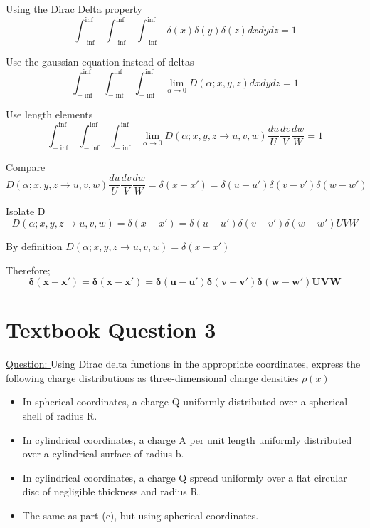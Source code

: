 \documentclass[English]{article}
\begin{document}
    Using the Dirac Delta property
    \begin{equation} \label{eq: 2-1}
        \int_{-\inf}^{\inf} \int_{-\inf}^{\inf} \int_{-\inf}^{\inf} \delta(x) \delta(y) \delta(z) dx dy dz = 1
    \end{equation}

    Use the gaussian equation instead of deltas
    \begin{equation} \label{eq: 2-2}
        \int_{-\inf}^{\inf} \int_{-\inf}^{\inf} \int_{-\inf}^{\inf} \lim_{\alpha \rightarrow 0} D(\alpha; x, y, z) dx dy dz = 1
    \end{equation}

    Use length elements
    \begin{equation} \label{eq: 2-3}
        \int_{-\inf}^{\inf} \int_{-\inf}^{\inf} \int_{-\inf}^{\inf} \lim_{\alpha \rightarrow 0} D(\alpha; x, y, z \rightarrow u, v, w) \frac{du}{U} \frac{dv}{V} \frac{dw}{W} = 1
    \end{equation}

    Compare
    \begin{equation} \label{eq: 2-4}
        D(\alpha; x, y, z \rightarrow u, v, w) \frac{du}{U} \frac{dv}{V} \frac{dw}{W} = \delta(x-x') = \delta(u-u') \delta(v-v') \delta(w-w')
    \end{equation}

    Isolate D
    \begin{equation} \label{eq: 2-5}
        D(\alpha; x, y, z \rightarrow u, v, w) = \delta(x-x') = \delta(u-u') \delta(v-v') \delta(w-w') UVW
    \end{equation}

    By definition
    $D(\alpha; x, y, z \rightarrow u, v, w) = \delta(x-x')$

    Therefore;
    \begin{equation} \label{eq: 2-6}
        \boxed{\boldsymbol{\delta(x-x') = \delta(x-x') = \delta(u-u') \delta(v-v') \delta(w-w') UVW}}
    \end{equation}

\newpage
\section{Textbook Question 3} \label{section3}
    \underline{Question: }
    \newline Using Dirac delta functions in the appropriate coordinates, express the following charge distributions as three-dimensional charge densities $\rho(x)$
    \begin{itemize}
        \item In spherical coordinates, a charge Q uniformly distributed over a spherical shell of radius R.
        \item In cylindrical coordinates, a charge A per unit length uniformly distributed over a cylindrical surface of radius b.
        \item In cylindrical coordinates, a charge Q spread uniformly over a flat circular disc of negligible thickness and radius R.
        \item The same as part (c), but using spherical coordinates.
    \end{itemize}
\end{document}
